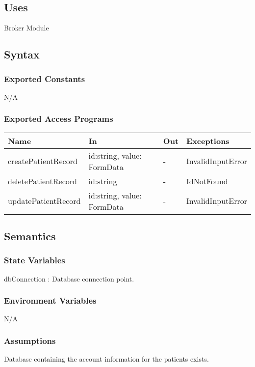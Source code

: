 \documentclass[12pt, titlepage]{article}
\begin{document}
\subsection{Uses}
Broker Module\\

\subsection{Syntax}

\subsubsection{Exported Constants}
N/A

\subsubsection{Exported Access Programs}

\begin{center}
\begin{tabular}{p{2cm} p{4cm} p{4cm} p{2cm}}
\hline
\textbf{Name} & \textbf{In} & \textbf{Out} & \textbf{Exceptions} \\
\hline
createPatientRecord & id:string, value: FormData & - & InvalidInputError \\
deletePatientRecord & id:string & - & IdNotFound\\
updatePatientRecord & id:string, value: FormData & - & InvalidInputError \\
\hline
\end{tabular}
\end{center}

\subsection{Semantics}

\subsubsection{State Variables}
dbConnection : Database connection point.

\subsubsection{Environment Variables}
N/A

\subsubsection{Assumptions}
Database containing the account information for the patients exists.
\end{document}
